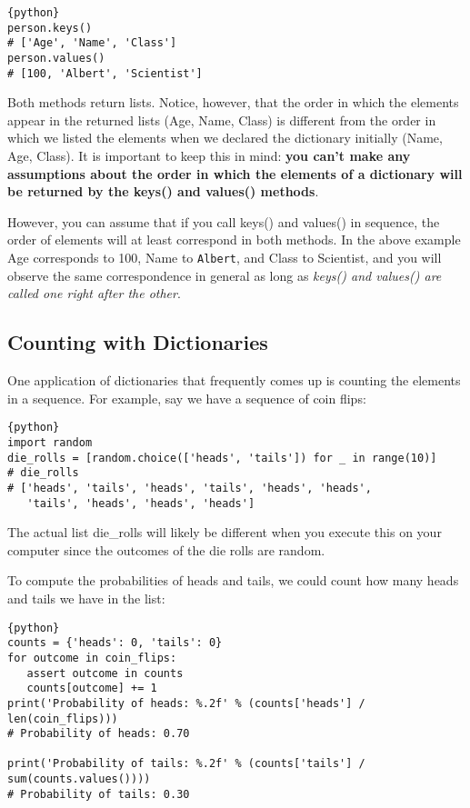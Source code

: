 \begin{lstlisting}{python}
person.keys()
# ['Age', 'Name', 'Class']
person.values()
# [100, 'Albert', 'Scientist']
\end{lstlisting}

Both methods return lists. Notice, however, that the order in which the
elements appear in the returned lists (Age, Name, Class) is different
from the order in which we listed the elements when we declared the
dictionary initially (Name, Age, Class). It is important to keep this in
mind: \textbf{you can't make any assumptions about the order in which
the elements of a dictionary will be returned by the keys() and values()
methods}.

However, you can assume that if you call keys() and values() in
sequence, the order of elements will at least correspond in both
methods. In the above example Age corresponds to 100, Name to \verb|Albert|,
and Class to Scientist, and you will observe the same correspondence in
general as long as \textit{keys() and values() are called one right
after the other}.

\subsection{Counting with
Dictionaries}\label{counting-with-dictionaries}

One application of dictionaries that frequently comes up is counting the
elements in a sequence. For example, say we have a sequence of coin
flips:

\begin{lstlisting}{python}
import random
die_rolls = [random.choice(['heads', 'tails']) for _ in range(10)]
# die_rolls
# ['heads', 'tails', 'heads', 'tails', 'heads', 'heads', 
   'tails', 'heads', 'heads', 'heads']
\end{lstlisting}

The actual list die\_rolls will likely be different when you execute
this on your computer since the outcomes of the die rolls are random.

To compute the probabilities of heads and tails, we could count how many
heads and tails we have in the list:

\begin{lstlisting}{python}
counts = {'heads': 0, 'tails': 0}
for outcome in coin_flips:
   assert outcome in counts
   counts[outcome] += 1
print('Probability of heads: %.2f' % (counts['heads'] / len(coin_flips)))
# Probability of heads: 0.70

print('Probability of tails: %.2f' % (counts['tails'] / sum(counts.values())))
# Probability of tails: 0.30
\end{lstlisting}

